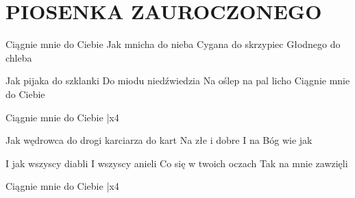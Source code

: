 \documentclass[../../../songbook.tex]{subfiles}
\begin{document}
\TabPositions{8cm} %
\section*{PIOSENKA ZAUROCZONEGO}
{}
\vspace{0.5cm}
Ciągnie mnie do Ciebie           \newline
Jak mnicha do nieba 			\newline
Cygana do skrzypiec              \newline
Głodnego do chleba 			\newline

Jak pijaka do szklanki   			\newline        
Do miodu niedźwiedzia 			\newline
Na oślep na pal licho     			\newline       
Ciągnie mnie do Ciebie 			\newline

\-\hspace{1cm} Ciągnie mnie do Ciebie  |x4 			\newline

Jak wędrowca do drogi    			\newline   
karciarza do kart 			\newline
Na złe i dobre       			\newline                
I na Bóg wie jak 			\newline

I jak wszyscy diabli   			\newline            
I wszyscy anieli 			\newline
Co się w twoich oczach     			\newline  
Tak na mnie zawzięli 			\newline

\-\hspace{1cm} Ciągnie mnie do Ciebie |x4 			\newline
\end{document}
